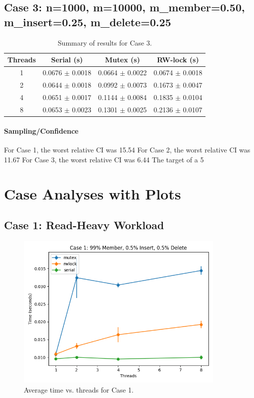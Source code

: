 \documentclass{article}
\begin{document}
\subsection*{Case 3: n=1000, m=10000, m\_member=0.50, m\_insert=0.25, m\_delete=0.25}
\begin{table}[h!]
\centering
\begin{tabular}{cccc}
\toprule
\textbf{Threads} & \textbf{Serial (s)} & \textbf{Mutex (s)} & \textbf{RW-lock (s)} \\
\midrule
1 & 0.0676 $\pm$ 0.0018 & 0.0664 $\pm$ 0.0022 & 0.0674 $\pm$ 0.0018 \\
2 & 0.0644 $\pm$ 0.0018 & 0.0992 $\pm$ 0.0073 & 0.1673 $\pm$ 0.0047 \\
4 & 0.0651 $\pm$ 0.0017 & 0.1144 $\pm$ 0.0084 & 0.1835 $\pm$ 0.0104 \\
8 & 0.0653 $\pm$ 0.0023 & 0.1301 $\pm$ 0.0025 & 0.2136 $\pm$ 0.0107 \\
\bottomrule
\end{tabular}
\caption{Summary of results for Case 3.}
\label{tab:case3}
\end{table}
\paragraph{Sampling/Confidence}
For Case 1, the worst relative CI was 15.54%
For Case 2, the worst relative CI was 11.67%
For Case 3, the worst relative CI was 6.44%
The target of a 5%
\newpage
\section*{Case Analyses with Plots}
\subsection*{Case 1: Read-Heavy Workload}
\begin{figure}[h!]
\centering
\includegraphics[width=0.9\textwidth]{report/graphs/case1_plot.png}
\caption{Average time vs. threads for Case 1.}
\label{fig:case1}
\end{figure}
\end{document}
